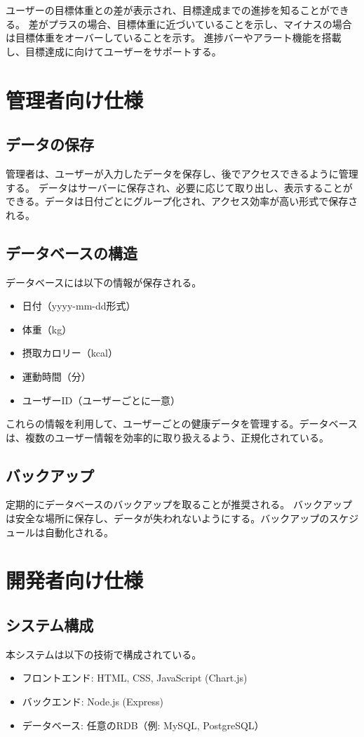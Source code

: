 \documentclass[uplatex,dvipdfmx]{jsarticle}
\begin{document}
ユーザーの目標体重との差が表示され、目標達成までの進捗を知ることができる。
差がプラスの場合、目標体重に近づいていることを示し、マイナスの場合は目標体重をオーバーしていることを示す。
進捗バーやアラート機能を搭載し、目標達成に向けてユーザーをサポートする。

\section{管理者向け仕様}

\subsection{データの保存}
管理者は、ユーザーが入力したデータを保存し、後でアクセスできるように管理する。
データはサーバーに保存され、必要に応じて取り出し、表示することができる。データは日付ごとにグループ化され、アクセス効率が高い形式で保存される。

\subsection{データベースの構造}
データベースには以下の情報が保存される。
\begin{itemize}
    \item 日付（yyyy-mm-dd形式）
    \item 体重（kg）
    \item 摂取カロリー（kcal）
    \item 運動時間（分）
    \item ユーザーID（ユーザーごとに一意）
\end{itemize}

これらの情報を利用して、ユーザーごとの健康データを管理する。データベースは、複数のユーザー情報を効率的に取り扱えるよう、正規化されている。

\subsection{バックアップ}
定期的にデータベースのバックアップを取ることが推奨される。
バックアップは安全な場所に保存し、データが失われないようにする。バックアップのスケジュールは自動化される。

\section{開発者向け仕様}

\subsection{システム構成}
本システムは以下の技術で構成されている。
\begin{itemize}
    \item フロントエンド: HTML, CSS, JavaScript (Chart.js)
    \item バックエンド: Node.js (Express)
    \item データベース: 任意のRDB（例: MySQL, PostgreSQL）
\end{itemize}
\end{document}
